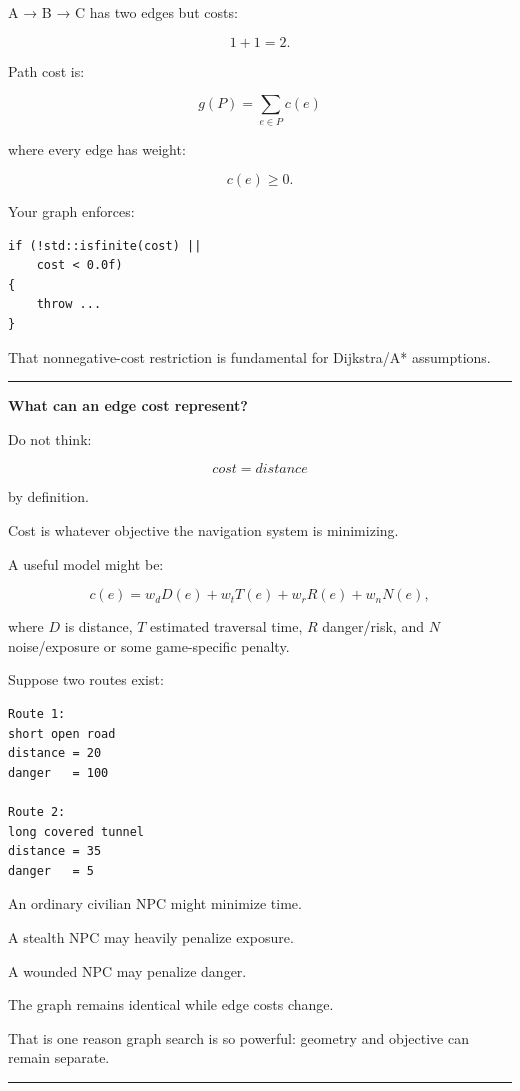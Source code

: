 A → B → C has two edges but costs:

\[
1+1=2.
\]

Path cost is:

\[
\boxed{
g(P)=
\sum_{e\in P}c(e)
}
\]

where every edge has weight:

\[
c(e)\ge0.
\]

Your graph enforces:

\begin{verbatim}
if (!std::isfinite(cost) ||
    cost < 0.0f)
{
    throw ...
}
\end{verbatim}

That nonnegative-cost restriction is fundamental for Dijkstra/A* assumptions.

\begin{center}\rule{0.5\linewidth}{0.5pt}\end{center}

\textbf{What can an edge cost represent?}

Do not think:

\[
cost = distance
\]

by definition.

Cost is whatever objective the navigation system is minimizing.

A useful model might be:

\[
c(e)
=
w_dD(e)
+
w_tT(e)
+
w_rR(e)
+
w_nN(e),
\]

where \(D\) is distance, \(T\) estimated traversal time, \(R\) danger/risk, and \(N\) noise/exposure or some game-specific penalty.

Suppose two routes exist:

\begin{verbatim}
Route 1:
short open road
distance = 20
danger   = 100

Route 2:
long covered tunnel
distance = 35
danger   = 5
\end{verbatim}

An ordinary civilian NPC might minimize time.

A stealth NPC may heavily penalize exposure.

A wounded NPC may penalize danger.

The graph remains identical while edge costs change.

That is one reason graph search is so powerful: geometry and objective can remain separate.

\begin{center}\rule{0.5\linewidth}{0.5pt}\end{center}


